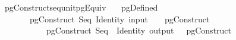 \ pgConstruct{\isacharunderscore}seq{\isacharunderscore}unit{\isacharunderscore}pgEquiv{\isacharcolon}\isanewline
\ \ \ {\isachardoublequoteopen}pgDefined\ \isanewline
\ \ \ \ \ \ \ {\isachardoublequoteopen}pgConstruct\ {\isacharparenleft}Seq\ {\isacharparenleft}Identity\ {\isacharparenleft}input\ \ \ {\isasymapprox}\ pgConstruct\ \isanewline
\ \ \ \ \ \ \ \ \ \ \ {\isachardoublequoteopen}pgConstruct\ {\isacharparenleft}Seq\ \ {\isacharparenleft}Identity\ {\isacharparenleft}output\ \ {\isasymapprox}\ pgConstruct\ 
